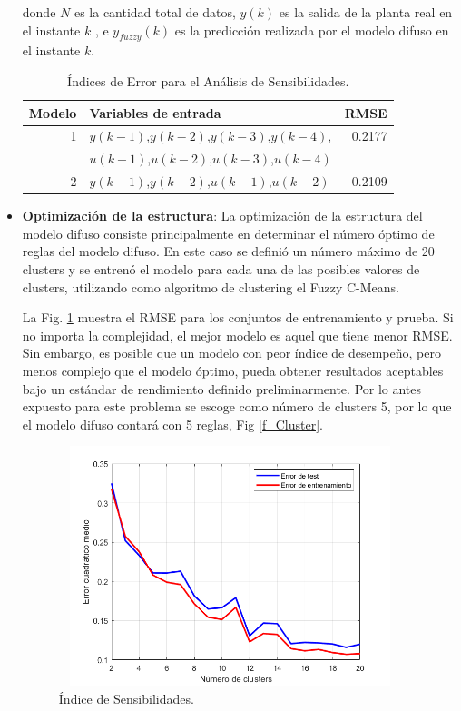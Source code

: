 \documentclass[12pt]{article}
\begin{document}
\begin{itemize}
donde $N$ es la cantidad total de datos, $y(k)$ es la salida de la planta real en el instante $k$ , e $y_{fuzzy}(k)$ es la predicción realizada por el modelo difuso en el instante $k$.

\begin{table}[htbp]
  \centering
  \caption{Índices de Error para el Análisis de Sensibilidades.}
    \begin{tabular}{|r|l|r|}
    \toprule
    \multicolumn{1}{|p{4.055em}|}{Modelo } & \multicolumn{1}{p{5.555em}|}{Variables de entrada } & \multicolumn{1}{p{4.055em}|}{RMSE} \\
    \midrule
    1     & $y(k-1)$,$y(k-2)$,$y(k-3)$,$y(k-4)$, & 0.2177 \\
    & $u(k-1)$,$u(k-2)$,$u(k-3)$,$u(k-4)$ & \\
    \midrule
    2     & $y(k-1)$,$y(k-2)$,$u(k-1)$,$u(k-2)$    & 0.2109 \\
    \bottomrule
    \end{tabular}%
  \label{t_Error}%
\end{table}%

\item \textbf{Optimización de la estructura}:
La optimización de la estructura del modelo difuso consiste principalmente en determinar el número óptimo de reglas del modelo difuso. En este caso se definió un número máximo de 20 clusters y se entrenó el modelo para cada una de las posibles valores de clusters, utilizando como algoritmo de clustering el Fuzzy C-Means.

La Fig. \ref{f_P1reglas11} muestra el RMSE para los conjuntos de entrenamiento y prueba.  Si no importa la complejidad, el mejor modelo es aquel que
tiene menor RMSE. Sin embargo, es posible que un modelo con peor índice de
desempeño, pero menos complejo que el modelo óptimo, pueda obtener resultados
aceptables bajo un estándar de rendimiento definido preliminarmente. Por lo antes expuesto para este problema se escoge como número de clusters 5, por lo que el modelo difuso contará con 5 reglas, Fig \ref{f_Cluster}.

\begin{figure}
\centering
\includegraphics[width=10cm,height=7cm]{imag/P1reglas12}
\caption{Índice de Sensibilidades.}
\label{f_P1reglas11}
\end{figure}


\end{itemize}
\end{document}

